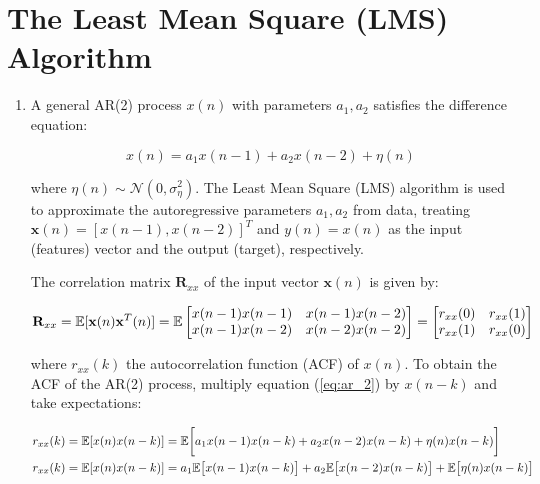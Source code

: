 \section{The Least Mean Square (LMS) Algorithm}

\begin{enumerate}[label=\alph*), leftmargin=*]

\item
%

A general AR(2) process $x(n)$ with parameters $a_{1}, a_{2}$ satisfies the difference equation:

\begin{equation}
    x(n) = a_{1} x(n - 1) + a_{2} x(n - 2) + \eta(n)
\label{eq:ar_2}
\end{equation}

where $\eta(n) \sim \mathcal{N}(0, \sigma_{\eta}^{2})$. The Least Mean Square (LMS) algorithm is used to approximate
the autoregressive parameters $a_{1}, a_{2}$ from data, treating $\mathbf{x}(n) = [x(n-1), x(n-2)]^{T}$ and
$y(n) = x(n)$ as the input (features) vector and the output (target), respectively.

The correlation matrix $\mathbf{R}_{xx}$ of the input vector $\mathbf{x}(n)$ is given by:

\begin{equation}
    \mathbf{R}_{xx} = {\mathbb{E}}[\mathbf{x}(n) \mathbf{x}^{T}(n)] = {\mathbb{E}}
    \begin{bmatrix}
        x(n-1) x(n-1) & x(n-1) x(n-2) \\
        x(n-1) x(n-2) & x(n-2) x(n-2)
    \end{bmatrix} =
    \begin{bmatrix}
        r_{xx}(0) & r_{xx}(1) \\
        r_{xx}(1) & r_{xx}(0)
    \end{bmatrix}
\label{eq:cov_ar_2}
\end{equation}

where $r_{xx}(k)$ the autocorrelation function (ACF) of $x(n)$. To obtain the ACF of the AR(2) process, multiply equation (\ref{eq:ar_2}) by $x(n-k)$ and take expectations:

\begin{align}
    r_{xx}(k) = {\mathbb{E}}[ x(n) x(n-k) ]   &= {\mathbb{E}} \bigg[ a_{1} x(n - 1) x(n-k) + a_{2} x(n - 2) x(n-k) + \eta(n) x(n-k) \bigg] \nonumber\\
    r_{xx}(k) = {\mathbb{E}}[ x(n) x(n-k) ]   &= a_{1} {\mathbb{E}} \big[ x(n - 1) x(n-k) \big] + a_{2} {\mathbb{E}} \big[ x(n - 2) x(n-k) \big] + {\mathbb{E}} \big[ \eta(n) x(n-k) \big]
\end{align}


\end{enumerate}
